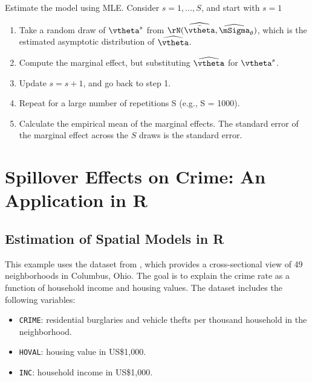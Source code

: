 \documentclass[english,12pt]{book}\usepackage[]{graphicx}\usepackage[]{xcolor}
\begin{document}
\begin{algorithm}
Estimate the model using MLE. Consider $s = 1, \ldots, S$, and start with $s = 1$
\begin{enumerate}
  \item Take a random draw of $\vtheta^{s}$ from $\rN(\widehat{\bar{\vtheta}}, \widehat{\mSigma}_{\theta})$, which is the estimated asymptotic distribution of $\widehat{\vtheta}$. 
 \item Compute the marginal effect, but substituting  $\widehat{\vtheta}$ for $\vtheta^s$. 
 \item Update $s = s + 1$, and go back to step 1. 
 \item Repeat for a large number of repetitions S (e.g., S = 1000).  
 \item Calculate the empirical mean of the marginal effects. The standard error of the marginal effect across the $S$ draws is the standard error. 
\end{enumerate}
\end{algorithm}

\section{Spillover Effects on Crime: An Application in R}\label{sec:Anselin-example}


\subsection{Estimation of Spatial Models in R}

This example uses the dataset from \citet{anselin1988spatial}, which provides a cross-sectional view of 49 neighborhoods in Columbus, Ohio. The goal is to explain the crime rate as a function of household income and housing values. The dataset includes the following variables:

\begin{itemize}
  \item \texttt{CRIME}: residential burglaries and vehicle thefts per thousand household in the neighborhood.
  \item \texttt{HOVAL}: housing value in US\$1,000.
  \item \texttt{INC}: household income in US\$1,000.
\end{itemize}
\end{document}
